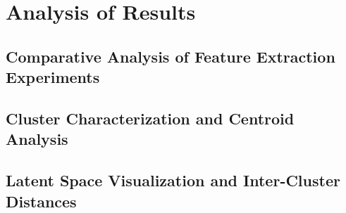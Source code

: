 \section{Analysis of Results}
    \subsection{Comparative Analysis of Feature Extraction Experiments}
    \subsection{Cluster Characterization and Centroid Analysis}
    \subsection{Latent Space Visualization and Inter-Cluster Distances}
